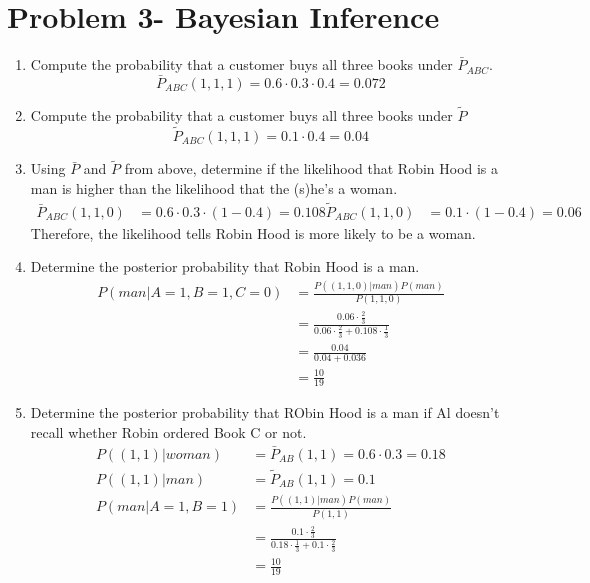 \documentclass[preprint,12pt]{elsarticle}
\begin{document}
	\section{Problem 3- Bayesian Inference}
	\begin{enumerate}[label=\alph*]
		\item Compute the probability that a customer buys all three
		books under $\bar{P}_{ABC}$.
		\begin{equation*}
			\bar{P}_{ABC}(1,1,1) = 0.6\cdot 0.3\cdot 0.4 = 0.072
 		\end{equation*}
		 
		\item Compute the probability that a customer buys all three
		books under $\tilde{P}$
		\begin{equation*}
			\tilde{P}_{ABC}(1,1,1) = 0.1\cdot 0.4 = 0.04
		\end{equation*}
		 
		\item Using $\bar{P}$ and $\tilde{P}$ from above, determine if 
		the likelihood that Robin Hood is a man is higher than the 
		likelihood that the (s)he's a woman.
		\begin{align*}
			\bar{P}_{ABC}(1,1,0) &= 0.6\cdot 0.3\cdot (1-0.4) = 0.108
			\tilde{P}_{ABC}(1,1,0) &= 0.1\cdot (1-0.4) = 0.06
		\end{align*}
		Therefore, the likelihood tells Robin Hood is more likely to be 
		a woman.

		\item Determine the posterior probability that Robin Hood is a man.
		\begin{align*}
			P(man|A=1,B=1,C=0) &= \frac{P((1,1,0)|man)P(man)}{P(1,1,0)}\\
			&= \frac{0.06\cdot \frac{2}{3}}{0.06\cdot \frac{2}{3}+0.108\cdot \frac{1}{3}}\\
			&= \frac{0.04}{0.04+0.036}\\
			&= \frac{10}{19}
		\end{align*}

		\item Determine the posterior probability that RObin Hood is a man if 
		Al doesn't recall whether Robin ordered Book C or not.
		\begin{align*}
			P((1,1)|woman) &= \bar{P}_{AB}(1,1) = 0.6\cdot 0.3 = 0.18\\
			P((1,1)|man) &= \tilde{P}_{AB}(1,1) = 0.1\\
			P(man|A=1,B=1) &= \frac{P((1,1)|man)P(man)}{P(1,1)}\\
			&= \frac{0.1\cdot \frac{2}{3}}{0.18\cdot \frac{1}{3} + 0.1\cdot \frac{2}{3}}\\
			&= \frac{10}{19}
		\end{align*}


\end{enumerate}
\end{document}
